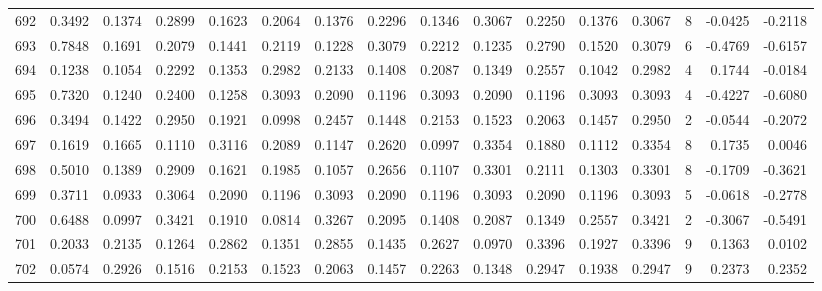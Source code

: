 \begin{tabular}{lrrrrrrrrrrrrrrr}
692 &      0.3492 &  0.1374 &  0.2899 &  0.1623 &  0.2064 &  0.1376 &  0.2296 &  0.1346 &  0.3067 &  0.2250 &   0.1376 &     0.3067 &      8 &                   -0.0425 &                    -0.2118 \\
693 &      0.7848 &  0.1691 &  0.2079 &  0.1441 &  0.2119 &  0.1228 &  0.3079 &  0.2212 &  0.1235 &  0.2790 &   0.1520 &     0.3079 &      6 &                   -0.4769 &                    -0.6157 \\
694 &      0.1238 &  0.1054 &  0.2292 &  0.1353 &  0.2982 &  0.2133 &  0.1408 &  0.2087 &  0.1349 &  0.2557 &   0.1042 &     0.2982 &      4 &                    0.1744 &                    -0.0184 \\
695 &      0.7320 &  0.1240 &  0.2400 &  0.1258 &  0.3093 &  0.2090 &  0.1196 &  0.3093 &  0.2090 &  0.1196 &   0.3093 &     0.3093 &      4 &                   -0.4227 &                    -0.6080 \\
696 &      0.3494 &  0.1422 &  0.2950 &  0.1921 &  0.0998 &  0.2457 &  0.1448 &  0.2153 &  0.1523 &  0.2063 &   0.1457 &     0.2950 &      2 &                   -0.0544 &                    -0.2072 \\
697 &      0.1619 &  0.1665 &  0.1110 &  0.3116 &  0.2089 &  0.1147 &  0.2620 &  0.0997 &  0.3354 &  0.1880 &   0.1112 &     0.3354 &      8 &                    0.1735 &                     0.0046 \\
698 &      0.5010 &  0.1389 &  0.2909 &  0.1621 &  0.1985 &  0.1057 &  0.2656 &  0.1107 &  0.3301 &  0.2111 &   0.1303 &     0.3301 &      8 &                   -0.1709 &                    -0.3621 \\
699 &      0.3711 &  0.0933 &  0.3064 &  0.2090 &  0.1196 &  0.3093 &  0.2090 &  0.1196 &  0.3093 &  0.2090 &   0.1196 &     0.3093 &      5 &                   -0.0618 &                    -0.2778 \\
700 &      0.6488 &  0.0997 &  0.3421 &  0.1910 &  0.0814 &  0.3267 &  0.2095 &  0.1408 &  0.2087 &  0.1349 &   0.2557 &     0.3421 &      2 &                   -0.3067 &                    -0.5491 \\
701 &      0.2033 &  0.2135 &  0.1264 &  0.2862 &  0.1351 &  0.2855 &  0.1435 &  0.2627 &  0.0970 &  0.3396 &   0.1927 &     0.3396 &      9 &                    0.1363 &                     0.0102 \\
702 &      0.0574 &  0.2926 &  0.1516 &  0.2153 &  0.1523 &  0.2063 &  0.1457 &  0.2263 &  0.1348 &  0.2947 &   0.1938 &     0.2947 &      9 &                    0.2373 &                     0.2352 \\

\end{tabular}
